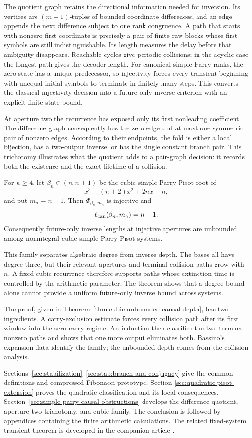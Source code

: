 The quotient graph retains the directional information needed for inversion.
Its vertices are $(m-1)$-tuples of bounded coordinate differences, and an
edge appends the next difference subject to one rank congruence.  A path that
starts with nonzero first coordinate is precisely a pair of finite raw blocks
whose first symbols are still indistinguishable.  Its length measures the
delay before that ambiguity disappears.  Reachable cycles give periodic
collisions; in the acyclic case the longest path gives the decoder length.
For canonical simple-Parry ranks, the zero state has a unique predecessor,
so injectivity forces every transient beginning with unequal initial symbols
to terminate in finitely many steps.
This converts the classical injectivity decision into a future-only inverse
criterion with an explicit finite state bound.

At aperture two the recurrence has exposed only its first nonleading
coefficient.  The difference graph consequently has the zero edge and at
most one symmetric pair of nonzero edges.  According to their endpoints,
the fold is either a local bijection, has a two-output inverse, or has the
single constant branch pair.  This trichotomy illustrates what the quotient
adds to a pair-graph decision: it records both the existence and the exact
lifetime of a collision.

\begin{introtheorem}
For $n\ge4$, let $\beta_n\in(n,n+1)$ be the cubic simple-Parry Pisot root of
\[
x^3-(n+2)x^2+2nx-n,
\]
and put $m_n=n-1$.  Then $\Phi_{\beta_n,m_n}$ is injective and
\[
\ell_{\rm cau}(\beta_n,m_n)=n-1.
\]
Consequently future-only inverse lengths at injective apertures are
unbounded among nonintegral cubic simple-Parry Pisot systems.
\end{introtheorem}

This family separates algebraic degree from inverse depth.  The bases all
have degree three, but their relevant apertures and terminal collision paths
grow with $n$.  A fixed cubic recurrence therefore supports paths whose
extinction time is controlled by the arithmetic parameter.  The theorem
shows that a degree bound alone cannot provide a uniform future-only inverse
bound across systems.

The proof, given in Theorem~\ref{thm:cubic-unbounded-causal-depth}, has two
ingredients.  A carry-exclusion estimate forces every collision path
after its first window into the zero-carry regime.  An induction then
classifies the two terminal nonzero paths and shows that one more output
eliminates both.  Bassino's expansion data identify the family; the
unbounded depth comes from the collision analysis.

Sections~\ref{sec:stabilization}--\ref{sec:stab:branch-and-conjugacy} give
the common definitions and compressed Fibonacci prototype.  Section
\ref{sec:quadratic-pisot-extension} proves the quadratic classification and
its local consequences.  Section~\ref{sec:simple-parry-causal-obstructions}
develops the difference quotient, aperture-two trichotomy, and cubic family.
The conclusion is followed by appendices containing the finite arithmetic
calculations.  The related fixed-system transient theorem is developed in the
companion article \cite{MaZhang2026LinearOverlap}.
